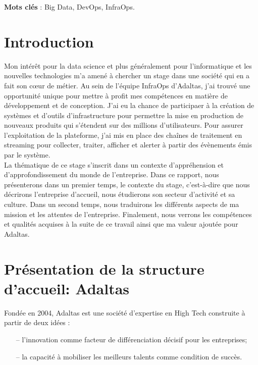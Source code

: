 \documentclass[12pt, french]{report}
\begin{document}
\noindent\textbf{Mots clés} : Big Data, DevOps, InfraOps.

\newpage
\thispagestyle{empty}
\mbox{}
\newpage

\begingroup
\hypersetup{linkcolor=black}
\listoffigures
\tableofcontents
\newpage
\endgroup

\chapter*{Introduction}

Mon intérêt pour la data science et plus généralement pour l’informatique et les nouvelles technologies m’a amené à chercher un stage dans une société qui en a fait son cœur de métier. Au sein de l'équipe InfraOps d'Adaltas, j'ai trouvé une opportunité unique pour mettre à profit mes compétences en matière de développement et de conception. J'ai eu la chance de participaer à la création de systèmes et d'outils d'infrastructure pour permettre la mise en production de nouveaux produits qui s'étendent sur des millions d'utilisateurs. Pour assurer l’exploitation de la plateforme, j'ai mis en place des chaînes de traitement en streaming pour collecter, traiter, afficher et alerter à partir des évènements émis par le système.\\

La thématique de ce stage s’inscrit dans un contexte d’appréhension et d'approfondissement du monde de l’entreprise. Dans ce rapport, nous présenterons dans un premier temps, le contexte du stage, c’est-à-dire que nous décrirons l’entreprise d’accueil, nous étudierons son secteur d’activité et sa culture. Dans un second temps, nous traduirons les différents aspects de ma mission et les attentes de l'entreprise. Finalement, nous verrons les compétences et qualités acquises à la suite de ce travail ainsi que ma valeur ajoutée pour Adaltas.

\chapter{Présentation de la structure d'accueil: Adaltas}

Fondée en 2004, Adaltas est une société d’expertise en High Tech construite à partir de deux idées :
\begin{itemize}
  \item[--] l’innovation comme facteur de différenciation décisif pour les entreprises;
  \item[--] la capacité à mobiliser les meilleurs talents comme condition de succès.\\
\end{itemize}
\end{document}
